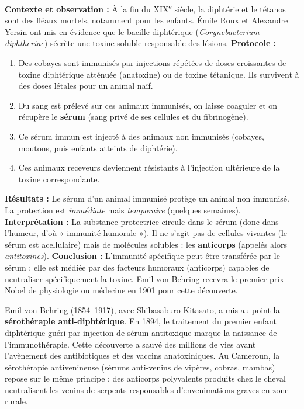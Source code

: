 \documentclass[11pt]{article}
\begin{document}
\begin{experience}
\textbf{Contexte et observation :} À la fin du XIX\textsuperscript{e} siècle, la diphtérie et le tétanos sont des fléaux mortels, notamment pour les enfants. Émile Roux et Alexandre Yersin ont mis en évidence que le bacille diphtérique (\emph{Corynebacterium diphtheriae}) sécrète une toxine soluble responsable des lésions.
\textbf{Protocole :}
\begin{enumerate}
\item Des cobayes sont immunisés par injections répétées de doses croissantes de toxine diphtérique atténuée (anatoxine) ou de toxine tétanique. Ils survivent à des doses létales pour un animal naïf.
\item Du sang est prélevé sur ces animaux immunisés, on laisse coaguler et on récupère le \textbf{sérum} (sang privé de ses cellules et du fibrinogène).
\item Ce sérum immun est injecté à des animaux non immunisés (cobayes, moutons, puis enfants atteints de diphtérie).
\item Ces animaux receveurs deviennent résistants à l'injection ultérieure de la toxine correspondante.
\end{enumerate}
\textbf{Résultats :} Le sérum d'un animal immunisé protège un animal non immunisé. La protection est \emph{immédiate} mais \emph{temporaire} (quelques semaines).
\textbf{Interprétation :} La substance protectrice circule dans le sérum (donc dans l'humeur, d'où « immunité humorale »). Il ne s'agit pas de cellules vivantes (le sérum est acellulaire) mais de molécules solubles : les \textbf{anticorps} (appelés alors \emph{antitoxines}).
\textbf{Conclusion :} L'immunité spécifique peut être transférée par le sérum ; elle est médiée par des facteurs humoraux (anticorps) capables de neutraliser spécifiquement la toxine. Emil von Behring recevra le premier prix Nobel de physiologie ou médecine en 1901 pour cette découverte.
\end{experience}

\begin{savaistu}
Emil von Behring (1854--1917), avec Shibasaburo Kitasato, a mis au point la \textbf{sérothérapie anti-diphtérique}. En 1894, le traitement du premier enfant diphtérique guéri par injection de sérum antitoxique marque la naissance de l'immunothérapie. Cette découverte a sauvé des millions de vies avant l'avènement des antibiotiques et des vaccins anatoxiniques. Au Cameroun, la sérothérapie antivenineuse (sérums anti-venins de vipères, cobras, mambas) repose sur le même principe : des anticorps polyvalents produits chez le cheval neutralisent les venins de serpents responsables d'envenimations graves en zone rurale.
\end{savaistu}
\end{document}
